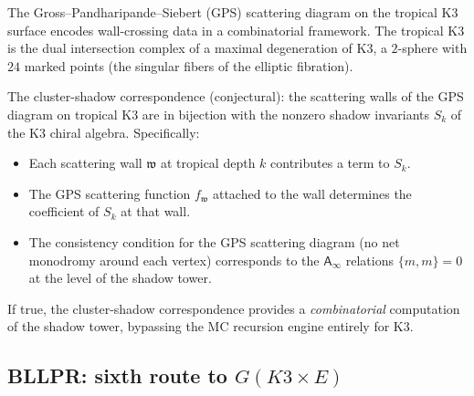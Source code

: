 \documentclass[11pt]{article}
\newcommand{\Ainf}{\mathsf{A}_{\infty}}
\newcommand{\fw}{\mathfrak{w}}
\begin{document}
\begin{observation}
\label{obs:tropical-k3}
The Gross--Pandharipande--Siebert (GPS) scattering diagram on the
tropical K3 surface encodes wall-crossing data in a combinatorial
framework. The tropical K3 is the dual intersection complex of a
maximal degeneration of K3, a $2$-sphere with $24$ marked points
(the singular fibers of the elliptic fibration).

The cluster-shadow correspondence (conjectural): the scattering
walls of the GPS diagram on tropical K3 are in bijection with the
nonzero shadow invariants $S_k$ of the K3 chiral algebra.
Specifically:
\begin{itemize}
 \item Each scattering wall $\fw$ at tropical depth $k$ contributes
 a term to $S_k$.
 \item The GPS scattering function $f_\fw$ attached to the wall
 determines the coefficient of $S_k$ at that wall.
 \item The consistency condition for the GPS scattering diagram
 (no net monodromy around each vertex) corresponds to the $\Ainf$
 relations $\{m, m\} = 0$ at the level of the shadow tower.
\end{itemize}
If true, the cluster-shadow correspondence provides a
\emph{combinatorial} computation of the shadow tower, bypassing the
MC recursion engine entirely for K3.
\end{observation}

\subsection{BLLPR: sixth route to $G(K3 \times E)$}
\label{subsec:bllpr-sixth-route}
\end{document}
